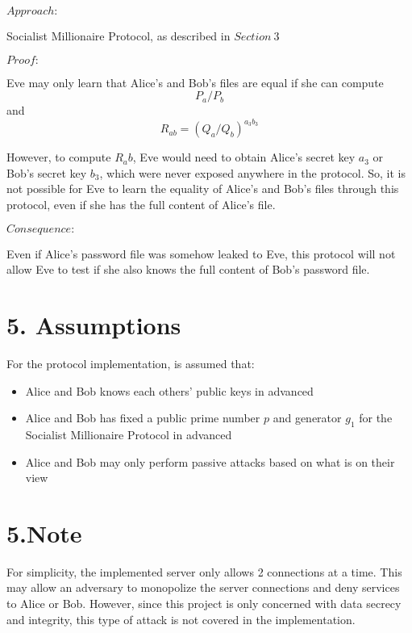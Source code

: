\documentclass{article}
\begin{document}
$Approach:$ 

Socialist Millionaire Protocol, as described in $Section\ 3$

$Proof:$

Eve may only learn that Alice's and Bob's files are equal if she can compute 
$$P_a / P_b$$ and $$R_{ab} = (Q_a/Q_b)^{a_3b_3}$$

However, to compute $R_ab$, Eve would need to obtain Alice's secret key $a_3$
or Bob's secret key $b_3$, which were never exposed anywhere in the protocol.
So, it is not possible for Eve to learn the equality of Alice's and Bob's files 
through this protocol, even if she has the full content of Alice's file.

$Consequence:$ 

Even if Alice's password file was somehow leaked to Eve, this protocol will not allow 
Eve to test if she also knows the full content of Bob's password file.

\section*{5. Assumptions}

For the protocol implementation, is assumed that:

\begin{itemize}
  \item Alice and Bob knows each others' public keys in advanced
  \item Alice and Bob has fixed a public prime number $p$ and generator $g_1$ 
  for the Socialist Millionaire Protocol in advanced
  \item Alice and Bob may only perform passive attacks based on what is on their view
\end{itemize}

\section*{5.Note}

For simplicity, the implemented server only allows 2 connections at a time. 
This may allow an adversary to monopolize the server connections and deny 
services to Alice or Bob. However, 
since this project is only concerned with data secrecy and 
integrity, this type of attack is not covered in the implementation.
\end{document}
